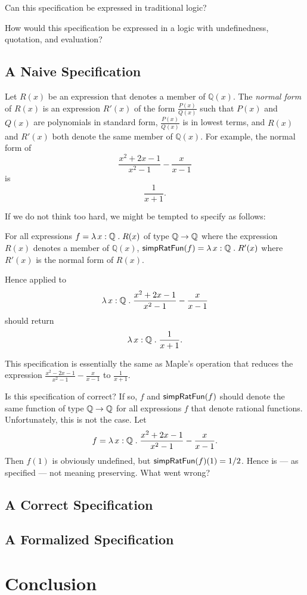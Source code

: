 \documentclass[fleqn]{llncs}
\begin{document}
  \item Can this specification be expressed in traditional logic?

  \item How would this specification be expressed in a logic with
    undefinedness, quotation, and evaluation?

\ee

\subsection{A Naive Specification}

Let $R(x)$ be an expression that denotes a member of $\mathbb{Q}(x)$.
The \emph{normal form} of $R(x)$ is an expression $R'(x)$ of the form
$\frac{P(x)}{Q(x)}$ such that $P(x)$ and $Q(x)$ are polynomials in
standard form, $\frac{P(x)}{Q(x)}$ is in lowest terms, and $R(x)$ and
$R'(x)$ both denote the same member of $\mathbb{Q}(x)$.  For example,
the normal form of \[\frac{x^2 + 2x - 1}{x^2 - 1} - \frac{x}{x - 1}\]
is \[\frac{1}{x + 1}.\]

If we do not think too hard, we might be tempted to specify
 as follows: 

\bi

  \item[] For all expressions $f = \lambda\, x : \mathbb{Q} \mathrel.
    R(x)$ of type $\mathbb{Q} \rightarrow \mathbb{Q}$ where the expression
    $R(x)$ denotes a member of $\mathbb{Q}(x)$, $\mbox{\sf simpRatFun}(f)
    = \lambda\, x : \mathbb{Q} \mathrel. R'(x)$ where $R'(x)$ is the
    normal form of $R(x)$.

\ei
%
Hence  applied to \[\lambda\, x : \mathbb{Q} \mathrel.
\frac{x^2 + 2x - 1}{x^2 - 1} - \frac{x}{x - 1}\] should return 
\[\lambda\, x : \mathbb{Q} \mathrel. \frac{1}{x + 1}.\]

This specification is essentially the same as Maple's 
operation that reduces the expression $\frac{x^2 - 2x - 1}{x^2 - 1} -
\frac{x}{x - 1}$ to $\frac{1}{x + 1}$.

Is this specification of  correct?  If so, $f$ and
$\mbox{\sf simpRatFun}(f)$ should denote the same function of type
$\mathbb{Q} \rightarrow \mathbb{Q}$ for all expressions $f$ that denote
rational functions.  Unfortunately, this is not the case.  Let \[f =
\lambda\, x : \mathbb{Q} \mathrel. \frac{x^2 + 2x - 1}{x^2 - 1} -
\frac{x}{x - 1}.\]  Then $f(1)$ is obviously undefined, but
$\mbox{\sf simpRatFun}(f)(1) = 1/2$.  Hence  is --- as
specified --- not meaning preserving.  What went wrong?

\subsection{A Correct Specification}

\subsection{A Formalized Specification}

\section{Conclusion}




\setcounter{tocdepth}{1}
\listoftodos
\setcounter{tocdepth}{0}
\end{document}
